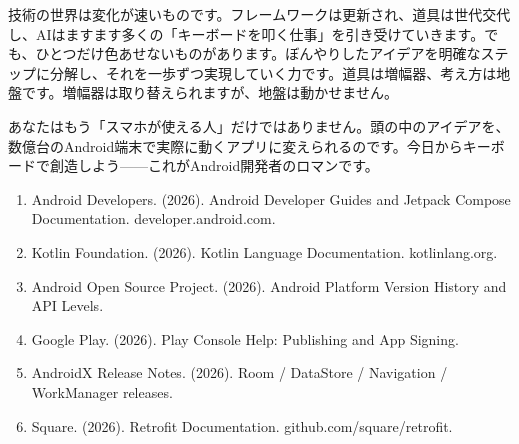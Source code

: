 技術の世界は変化が速いものです。フレームワークは更新され、道具は世代交代し、AIはますます多くの「キーボードを叩く仕事」を引き受けていきます。でも、ひとつだけ色あせないものがあります。ぼんやりしたアイデアを明確なステップに分解し、それを一歩ずつ実現していく力です。道具は増幅器、考え方は地盤です。増幅器は取り替えられますが、地盤は動かせません。

あなたはもう「スマホが使える人」だけではありません。頭の中のアイデアを、数億台のAndroid端末で実際に動くアプリに変えられるのです。今日からキーボードで創造しよう——これがAndroid開発者のロマンです。


\begin{enumerate}
  \item Android Developers. (2026). Android Developer Guides and Jetpack Compose Documentation. developer.android.com.
  \item Kotlin Foundation. (2026). Kotlin Language Documentation. kotlinlang.org.
  \item Android Open Source Project. (2026). Android Platform Version History and API Levels.
  \item Google Play. (2026). Play Console Help: Publishing and App Signing.
  \item AndroidX Release Notes. (2026). Room / DataStore / Navigation / WorkManager releases.
  \item Square. (2026). Retrofit Documentation. github.com/square/retrofit.
\end{enumerate}
